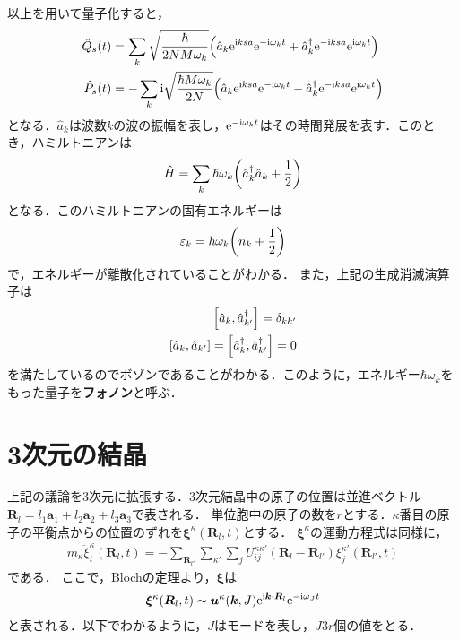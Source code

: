\documentclass{report}
\begin{document}
以上を用いて量子化すると，
\begin{align}
  \hat{Q}_s(t) &= \sum_{k} \sqrt{\frac{\hbar}{2NM\omega_k}} \qty(\hat{a}_k \mathrm{e}^{\mathrm{i} ksa} \mathrm{e}^{-\mathrm{i}\omega_k t} + \hat{a}_k^\dagger \mathrm{e}^{-\mathrm{i} ksa} \mathrm{e}^{\mathrm{i}\omega_k t})\\
  \hat{P}_s(t) &= -\sum_{k} \mathrm{i}\sqrt{\frac{\hbar M \omega_k}{2N}} \qty(\hat{a}_k \mathrm{e}^{\mathrm{i} ksa} \mathrm{e}^{-\mathrm{i}\omega_k t} - \hat{a}_k^\dagger \mathrm{e}^{-\mathrm{i} ksa} \mathrm{e}^{\mathrm{i}\omega_k t})
\end{align}
となる．$\hat{a}_k$は波数$k$の波の振幅を表し，$\mathrm{e}^{-\mathrm{i}\omega_k t}$はその時間発展を表す．このとき，ハミルトニアンは
\begin{align}
  \hat{H} = \sum_{k} \hbar \omega_k \qty(\hat{a}_k^\dagger \hat{a}_k + \frac{1}{2})
\end{align}
となる．このハミルトニアンの固有エネルギーは
\begin{align}
  \varepsilon_k = \hbar\omega_k \qty(n_k + \frac{1}{2})
\end{align}
で，エネルギーが離散化されていることがわかる．
また，上記の生成消滅演算子は
\begin{align}
  \qty[\hat{a}_k,\hat{a}_{k'}^\dagger] = \delta_{kk'}\\
  \qty[\hat{a}_k,\hat{a}_{k'}] = \qty[\hat{a}_k^\dagger,\hat{a}_{k'}^\dagger] = 0
\end{align}
を満たしているのでボゾンであることがわかる．このように，エネルギー$\hbar\omega_k$をもった量子を\textbf{フォノン}と呼ぶ．

\section{3次元の結晶}
上記の議論を3次元に拡張する．3次元結晶中の原子の位置は並進ベクトル$\bm{R}_l = l_1\bm{a}_1 + l_2\bm{a}_2 + l_3\bm{a}_3$で表される．
単位胞中の原子の数を$r$とする．$\kappa$番目の原子の平衡点からの位置のずれを$\bm{\xi}^{\kappa}(\bm{R}_l,t)$とする．
$\bm{\xi}^{\kappa}$の運動方程式は同様に，
\begin{align}
  m_{\kappa}\ddot{\xi}_i^{\kappa}(\bm{R}_l,t) = - \sum_{\bm{R}_{l'}} \sum_{\kappa'} \sum_{j} U_{ij}^{\kappa\kappa'}(\bm{R}_l - \bm{R}_{l'}){\xi_j^{\kappa'}}(\bm{R}_{l'},t) \label{eom-3d}
\end{align}
である．
ここで，Blochの定理より，$\bm{\xi}$は
\begin{align}
  \bm{\xi}^{\kappa}(\bm{R}_l,t) \sim \bm{u}^{\kappa} (\bm{k},J)\mathrm{e}^{\mathrm{i} \bm{k}\cdot\bm{R}_l} \mathrm{e}^{-\mathrm{i} \omega_J t} \label{bloch}
\end{align}
と表される．以下でわかるように，$J$はモードを表し，$J3r$個の値をとる．
\end{document}
